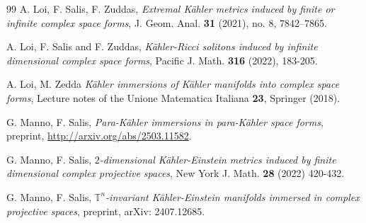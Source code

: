 \documentclass[11pt, reqno]{amsart}
\newcommand{\K }{K\"{a}hler }
\newcommand{\KE }{K\"{a}hler-Einstein }
\newcommand{\pk }{para-K\"{a}hler }
\begin{document}
{\begin{thebibliography}{99}
 A. Loi, F. Salis, F. Zuddas, \emph{Extremal \K metrics induced by finite or infinite complex space forms}, J. Geom. Anal. \textbf{31} (2021), no. 8, 7842–7865.

   A. Loi, F. Salis and F. Zuddas, \emph{K\"ahler-Ricci solitons induced by infinite dimensional complex space forms}, Pacific J. Math. \textbf{316} (2022), 183-205.





 A. Loi, M. Zedda \emph{K\"ahler immersions of \K manifolds into complex space forms}, Lecture notes of the Unione Matematica Italiana \textbf{23}, Springer (2018).




 G. Manno, F. Salis, \emph{Para-\K immersions in \pk space forms}, preprint, \url{http://arxiv.org/abs/2503.11582}.

 G. Manno, F. Salis, \emph{$2$-dimensional \KE metrics induced by finite dimensional complex
projective spaces}, New York J. Math. \textbf{28}  (2022) 420-432.

 G. Manno, F. Salis, \emph{$\mathbb{T}^n$-invariant Kähler-Einstein manifolds immersed in
complex projective spaces}, preprint, arXiv: 2407.12685.








\end{thebibliography}}
\end{document}
